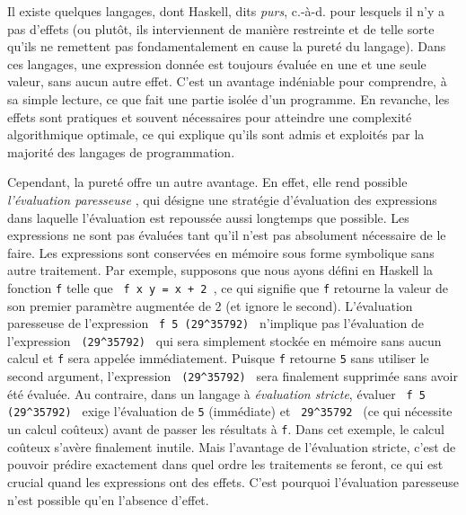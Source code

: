 \documentclass[a4paper,francais]{insalyon}
\newcommand{\cad}{c.-à-d.}
\begin{document}


Il existe quelques langages, dont Haskell, dits \emph{purs}, {\cad} pour lesquels il n'y a pas d'effets (ou plutôt, ils interviennent de manière restreinte et de telle sorte qu'ils ne remettent pas fondamentalement en cause la pureté du langage). Dans ces langages, une expression donnée est toujours évaluée en une et une seule valeur, sans aucun autre effet. C'est un avantage indéniable pour comprendre, à sa simple lecture, ce que fait une partie isolée d'un programme. En revanche, les effets sont pratiques et souvent nécessaires pour atteindre une complexité algorithmique optimale, ce qui explique qu'ils sont admis et exploités par la majorité des langages de programmation.    

Cependant, la pureté offre un autre avantage. En effet, elle rend possible \emph{l'évaluation paresseuse} \cite[Lecture 6: Lazy Evaluation]{coursHaskell}, qui désigne une stratégie d'évaluation des expressions dans laquelle l'évaluation est repoussée aussi longtemps que possible. Les expressions ne sont pas évaluées tant qu'il n'est pas absolument nécessaire de le faire. Les expressions sont conservées en mémoire sous forme symbolique sans autre traitement. Par exemple, supposons que nous ayons défini en Haskell la fonction \texttt{f} telle que \verb! f x y = x + 2 !, ce qui signifie que \texttt{f} retourne la valeur de son premier paramètre augmentée de 2 (et ignore le second). L'évaluation paresseuse de l'expression \verb! f 5 (29^35792) ! n'implique pas l'évaluation de l'expression \verb! (29^35792) ! qui sera simplement stockée en mémoire sans aucun calcul et \texttt{f} sera appelée immédiatement. Puisque \texttt{f} retourne \texttt{5} sans utiliser le second argument, l'expression \verb! (29^35792) ! sera finalement supprimée sans avoir été évaluée. Au contraire, dans un langage à \emph{évaluation stricte}, évaluer \verb! f 5 (29^35792) ! exige l'évaluation de \texttt{5} (immédiate) et \verb! 29^35792 ! (ce qui nécessite un calcul coûteux) avant de passer les résultats à \texttt{f}. Dans cet exemple, le calcul coûteux s'avère finalement inutile. Mais l'avantage de l'évaluation stricte, c'est de pouvoir prédire exactement dans quel ordre les traitements se feront, ce qui est crucial quand les expressions ont des effets. C'est pourquoi l'évaluation paresseuse n'est possible qu'en l'absence d'effet.
\end{document}
